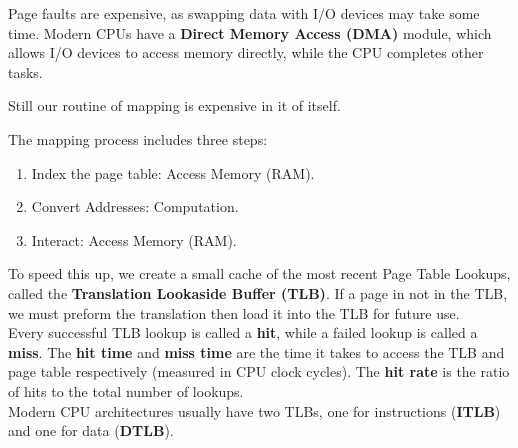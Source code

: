 \begin{Def}

    Page faults are expensive, as swapping data with I/O devices may take some time. Modern CPUs have a \textbf{Direct Memory Access (DMA)} module, which allows I/O devices to access memory directly, while the CPU completes other tasks. 
\end{Def}

\noindent
Still our routine of mapping is expensive in it of itself.
\begin{Def}

    The mapping process includes three steps:
    \begin{enumerate}
        \item Index the page table: Access Memory (RAM).
        \item Convert Addresses: Computation.
        \item Interact: Access Memory (RAM).
    \end{enumerate}
    \noindent
    To speed this up, we create a small cache of the most recent Page Table Lookups, called the \textbf{Translation Lookaside Buffer (TLB)}. If a 
    page in not in the TLB, we must preform the translation then load it into the TLB for future use.\\

    \noindent
    Every successful TLB lookup is called a \textbf{hit}, while a failed lookup is called a \textbf{miss}. The \textbf{hit time} and \textbf{miss time} are the time it takes to access the TLB and page table respectively (measured in CPU clock cycles).
    The \textbf{hit rate} is the ratio of hits to the total number of lookups.\\

    \noindent
    Modern CPU architectures usually have two TLBs, one for instructions (\textbf{ITLB}) and one for data (\textbf{DTLB}).
\end{Def}

